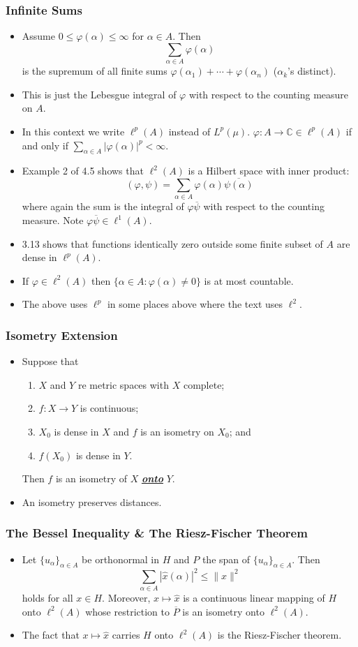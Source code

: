 \documentclass{article}
\newcounter{topicnumber}[section]
\newcommand{\steptopic}[1][1]{\addtocounter{topicnumber}{#1}}
\newenvironment{topic}[1]{%
\steptopic%
\subsubsection{#1}%
\begin{itemize}%
}{%
\end{itemize}%
}
\newcommand{\remark}{\item}
\newcommand{\note}{\item[{\em Note:}]}
\newcommand{\recall}{\item[{\em Recall:}]}
\begin{document}
\begin{topic}{Infinite Sums}
\remark Assume $0 \leq \varphi(\alpha) \leq \infty$ for $\alpha \in A$. Then $$\sum_{\alpha \in A} \varphi(\alpha)$$ is the supremum of all finite sums $\varphi(\alpha_1) + \cdots + \varphi(\alpha_n)$ ($\alpha_k$'s distinct).
\remark This is just the Lebesgue integral of $\varphi$ with respect to the counting measure on $A$.
\remark In this context we write $\ell^p(A)$ instead of $L^p(\mu)$. $\varphi : A \to \mathbb{C} \in \ell^p(A)$ if and only if $\sum_{\alpha \in A} |\varphi(\alpha)|^p < \infty.$
\remark Example 2 of 4.5 shows that $\ell^2(A)$ is a Hilbert space with inner product: $$(\varphi, \psi) = \sum_{\alpha \in A} \varphi(\alpha)\overline{\psi(\alpha)}$$ where again the sum is the integral of $\varphi\overline{\psi}$ with respect to the counting measure. Note $\varphi\overline{\psi} \in \ell^1(A)$.
\remark 3.13 shows that functions identically zero outside some finite subset of $A$ are dense in $\ell^p(A)$.
\remark If $\varphi \in \ell^2(A)$ then $\{\alpha \in A : \varphi(\alpha) \neq 0 \}$ is at most countable.
\note The above uses $\ell^p$ in some places above where the text uses $\ell^2$.
\end{topic}

\begin{topic}{Isometry Extension}
\remark Suppose that \begin{enumerate}
\item $X$ and $Y$ re metric spaces with $X$ complete;
\item $f : X \to Y$ is continuous;
\item $X_0$ is dense in $X$ and $f$ is an isometry on $X_0$; and
\item $f(X_0)$ is dense in $Y$.
\end{enumerate}
Then $f$ is an isometry of $X$ {\bf\em\underline{onto}} $Y$.
\recall An isometry preserves distances.
\end{topic}

\begin{topic}{The Bessel Inequality \& The Riesz-Fischer Theorem}
\remark Let $\{u_\alpha\}_{\alpha \in A}$ be orthonormal in $H$ and $P$ the span of $\{u_\alpha\}_{\alpha \in A}$. Then $$\sum_{\alpha \in A} |\hat{x}(\alpha)|^2 \leq \|x\|^2$$ holds for all $x \in H$. Moreover, $x \mapsto \hat{x}$ is a continuous linear mapping of $H$ onto $\ell^2(A)$ whose restriction to $\overline{P}$ is an isometry onto $\ell^2(A)$.
\remark The fact that $x \mapsto \hat{x}$ carries $H$ onto $\ell^2(A)$ is the Riesz-Fischer theorem.
\end{topic}
\end{document}
